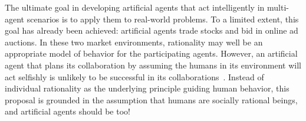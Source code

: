 The ultimate goal in developing artificial agents that act
intelligently in multi-agent scenarios is to apply them to real-world
problems.  To a limited extent, this goal has already been achieved:
artificial agents trade stocks and bid in online ad auctions.  In
these two market environments, rationality may well be an appropriate
model of behavior for the participating agents.  However,
an artificial agent that plans its collaboration by assuming the
humans in its environment will act selfishly is unlikely to be
successful in its collaborations~\cite{Camerer:2003,kahnemanst82}.
Instead of individual rationality as the underlying principle guiding
human behavior, this proposal is grounded in the assumption that
humans are socially rational beings, and artificial agents should be
too!  

